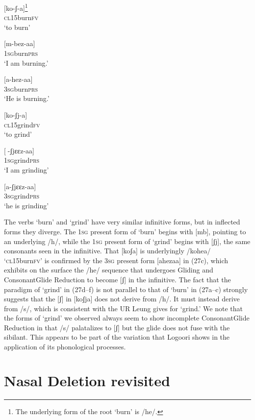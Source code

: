 \documentclass[output=paper]{langsci/langscibook}
\begin{document}
\ea{}
 [ko-ʃ{}-a]\footnote{   The underlying form of the root ‘burn’ is /he/.} \\{}
\textsc{cl15}burn\textsc{fv}\\{}
\glt ‘to burn’
\z


\ea{}
 [m-bez-aa]\\{}
\textsc{1sg}burn\textsc{prs}\\{}
\glt ‘I am burning.’
\z


\ea{}
 [a-hez-aa]\\{}
\textsc{3sg}burn\textsc{prs}\\{}
\glt ‘He is burning.’
\z


\ea{}
 [ko-ʃj-a]\\{}
\textsc{cl15}grind\textsc{fv}\\{}
\glt ‘to grind’
\z


\ea{}
 [-ʃjɛɛz-aa]\\{}
\textsc{1sg}grind\textsc{prs}\\{}
\glt ‘I am grinding’
\z


\ea{}
 [a-ʃjɛɛz-aa]\\{}
\textsc{3sg}grind\textsc{prs}\\{}
\glt ‘he is grinding’
\z

The verbs ‘burn’ and ‘grind’ have very similar infinitive forms, but in inflected forms they diverge. The 1\textsc{sg} present form of ‘burn’ begins with [mb], pointing to an underlying /h/, while the 1\textsc{sg} present form of ‘grind’ begins with [ʃj], the same consonants seen in the infinitive. That [koʃa] is underlyingly /kohea/ ‘\textsc{cl}15burn\textsc{fv’} is confirmed by the 3\textsc{sg} present form [ahezaa] in (27c), which exhibits on the surface the /he/ sequence that undergoes Gliding and ConsonantGlide Reduction to become [ʃ] in the infinitive. The fact that the paradigm of ‘grind’ in (27d–f) is not parallel to that of ‘burn’ in (27a–c) strongly suggests that the [ʃ] in [koʃja] does not derive from /h/. It must instead derive from /s/, which is consistent with the UR Leung gives for ‘grind.’ We note that the forms of ‘grind’ we observed always seem to show incomplete ConsonantGlide Reduction in that /s/ palatalizes to [ʃ] but the glide does not fuse with the sibilant. This appears to be part of the variation that Logoori shows in the application of its phonological processes.

\section{Nasal Deletion revisited}
\end{document}
